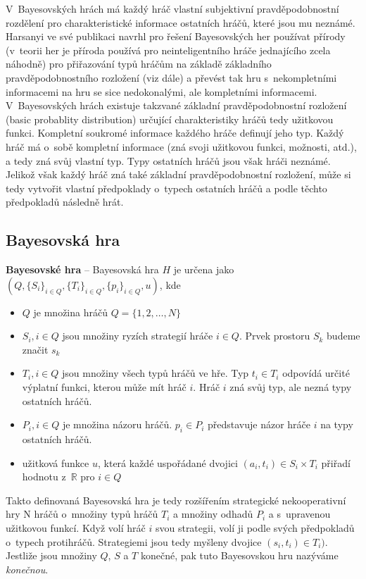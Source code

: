 \documentclass[12pt,a4paper,titlepage,final]{article}
\newcounter{defcounter} \setcounter{defcounter}{0}
\newenvironment{definition}[1][Definice]{\begin{trivlist}
\item[\hskip \labelsep \refstepcounter{defcounter} {\bfseries #1} {\bfseries \arabic{defcounter}}.]}{\end{trivlist}}
\begin{document}
V~Bayesovských hrách má každý hráč vlastní subjektivní pravděpodobnostní rozdělení pro charakteristické informace ostatních hráčů, které jsou mu neznámé.
Harsanyi ve své publikaci navrhl pro řešení Bayesovských her používat přírody (v~teorii her je příroda používá pro neinteligentního hráče jednajícího zcela náhodně) pro přiřazování typů hráčům na základě základního pravděpodobnostního rozložení (viz dále) a převést tak hru s~nekompletními informacemi na hru se sice nedokonalými, ale kompletními informacemi.
V~Bayesovských hrách existuje takzvané základní pravděpodobnostní rozložení (basic probablity distribution)\cite{Harsanyi2004} určující charakteristiky hráčů tedy užitkovou funkci.
Kompletní soukromé informace každého hráče definují jeho typ.
Každý hráč má o~sobě kompletní informace (zná svoji užitkovou funkci, možnosti, atd.), a tedy zná svůj vlastní typ.
Typy ostatních hráčů jsou však hráči neznámé.
Jelikož však každý hráč zná také základní pravděpodobnostní rozložení, může si tedy vytvořit vlastní předpoklady o~typech ostatních hráčů a podle těchto předpokladů následně hrát. 

\subsection{Bayesovská hra}
\begin{definition}
 \textbf{Bayesovské hra} -- Bayesovská hra $H$ je určena jako \\
 $(Q, \{S_i\}_{i \in Q}, \{T_i\}_{i \in Q}, \{p_i\}_{i \in Q}, u)$, kde
\begin{itemize}
 \item $Q$ je množina hráčů $Q = \{1,2,\dots , N\}$
 \item $S_i, i \in Q$ jsou množiny ryzích strategií hráče $i \in Q$. Prvek prostoru $S_k$ budeme značit $s_k$
 \item $T_i, i \in Q$ jsou množiny všech typů hráčů ve hře. Typ $t_i \in T_i$ odpovídá určité výplatní funkci, kterou může mít hráč $i$. Hráč $i$ zná svůj typ, ale nezná typy ostatních hráčů.
 \item $P_i, i \in Q$ je množina názoru hráčů. $p_i \in P_i$ představuje názor hráče $i$ na typy ostatních hráčů.
 \item užitková funkce $u$, která každé uspořádané dvojici $(a_i, t_i) \in S_i \times T_i $ přiřadí hodnotu z~$\mathds{R}$ pro $i \in Q$
\end{itemize}
\end{definition}
Takto definovaná Bayesovská hra je tedy rozšířením strategické nekooperativní hry N hráčů o~množiny typů hráčů $T_i$ a množiny odhadů $P_i$ a s~upravenou užitkovou funkcí.
Když volí hráč $i$  svou strategii, volí ji podle svých předpokladů o~typech protihráčů.
Strategiemi jsou tedy myšleny dvojice $(s_i, t_i) \in T_i)$.
Jestliže jsou množiny $Q$, $S$ a $T$ konečné, pak tuto Bayesovskou hru nazýváme \textit{konečnou}.
\end{document}
